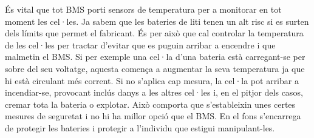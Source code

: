 És vital que tot BMS porti sensors de temperatura per a monitorar en tot moment les cel·les. Ja sabem que les bateries de liti tenen un alt risc si es surten dels límits que permet el fabricant. És per això que cal controlar la temperatura de les cel·les per tractar d'evitar que es puguin arribar a encendre i que malmetin el BMS. Si per exemple una cel·la d'una bateria està carregant-se per sobre del seu voltatge, aquesta comença a augmentar la seva temperatura ja que hi està circulant més corrent. Si no s'aplica cap mesura, la cel·la pot arribar a incendiar-se, provocant inclús danys a les altres cel·les i, en el pitjor dels casos, cremar tota la bateria o explotar. Això comporta que s'estableixin unes certes mesures de seguretat i no hi ha millor opció que el BMS. En el fons s'encarrega de protegir les bateries i protegir a l'individu que estigui manipulant-les.

